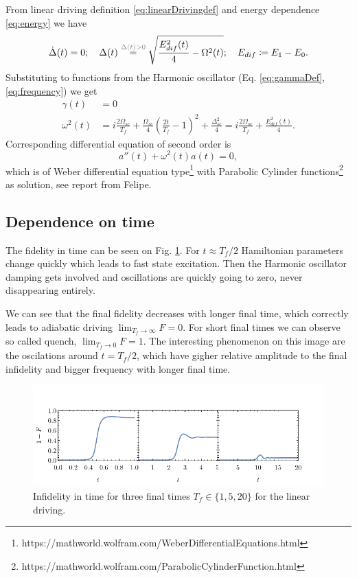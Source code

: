 From linear driving definition \ref{eq:linearDrivingdef} and energy dependence \ref{eq:energy} we have
\begin{equation}
    \dot \Delta(t)=0;\quad \Delta(t) \overset{\textcolor{gray}{\Delta(t)>0}}{=} \sqrt{\frac{E^2_{dif}(t)}{4}-\Omega^2(t)};\quad E_{dif}\coloneqq E_1-E_0.
\end{equation}
Substituting to functions from the Harmonic oscillator (Eq. \ref{eq:gammaDef}, \ref{eq:frequency}) we get 
\begin{align}
    \gamma(t) &= 0\\
    \omega^2(t)&=i\frac{2\Omega_{sc}}{T_f}+\frac{\Omega_{sc}}{4}\left(\frac{2t}{T_f}-1\right)^2+\frac{\Delta_{sc}^2}{4}=i\frac{2\Omega_{sc}}{T_f}+\frac{E^2_{dif}(t)}{4}.
    \label{eq:oscillationsLinear}
\end{align}
Corresponding differential equation of second order is
\begin{equation}
    a''(t)+\omega^2(t) a(t)=0,
\end{equation}
which is of Weber differential equation type\footnote{https://mathworld.wolfram.com/WeberDifferentialEquations.html} with Parabolic Cylinder functions\footnote{https://mathworld.wolfram.com/ParabolicCylinderFunction.html} as solution, see report from Felipe. 

\subsection{Dependence on time}
The fidelity in time can be seen on Fig. \ref{fig:infidelityTimePlotLin}. For $t\approx T_f/2$ Hamiltonian parameters change quickly which leads to fast state excitation. Then the Harmonic oscillator damping gets involved and oscillations are quickly going to zero, never disappearing entirely.

We can see that the final fidelity decreases with longer final time, which correctly leads to adiabatic driving $\lim_{T_f\rightarrow \infty} F=0$. For short final times we can observe so called quench, $\lim_{T_f\rightarrow 0} F=1$. The interesting phenomenon on this image are the oscilations around $t=T_f/2$, which have gigher relative amplitude to the final infidelity and bigger frequency with longer final time. 

\begin{figure}[H]
    \centering 
    \includegraphics[scale=1.185]{../img/infidelityInTimePlot1.pdf}
    \caption{Infidelity in time for three final times $T_f\in\{1,5,20\}$ for the linear driving.}
  \label{fig:infidelityTimePlotLin}
\end{figure}


